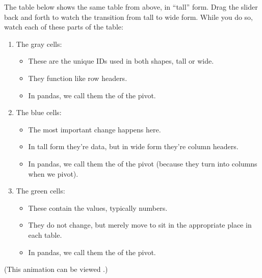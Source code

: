 \documentclass[letterpaper,10pt,english]{sphinxmanual}
\begin{document}
The table below shows the same table from above, in “tall” form.  Drag the slider back and forth to watch the transition from tall to wide form.  While you do so, watch each of these parts of the table:
\begin{enumerate}
%
\item {} 
The gray cells:
\begin{itemize}
\item {} 
These are the unique IDs used in both shapes, tall or wide.

\item {} 
They function like row headers.

\item {} 
In pandas, we call them the  of the pivot.

\end{itemize}

\item {} 
The blue cells:
\begin{itemize}
\item {} 
The most important change happens here.

\item {} 
In tall form they’re data, but in wide form they’re column headers.

\item {} 
In pandas, we call them the  of the pivot (because they turn into columns when we pivot).

\end{itemize}

\item {} 
The green cells:
\begin{itemize}
\item {} 
These contain the values, typically numbers.

\item {} 
They do not change, but merely move to sit in the appropriate place in each table.

\item {} 
In pandas, we call them the  of the pivot.

\end{itemize}

\end{enumerate}

(This animation can be viewed .)
\end{document}
